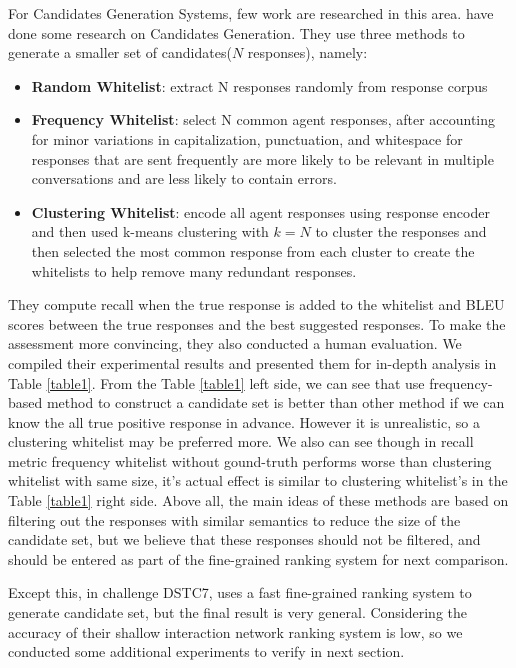 \documentclass{article}
\begin{document}
For Candidates Generation Systems, few work are researched in this area. \cite{swanson2019building} have done some research on Candidates Generation. They use three methods to generate a smaller set of candidates($N$ responses), namely: 

\begin{itemize}
	\item \textbf{Random Whitelist}: extract N responses randomly from response corpus 
	\item \textbf{Frequency Whitelist}: select N common agent responses, after accounting for minor variations in capitalization, punctuation, and whitespace for responses that are sent frequently are more likely to be relevant in multiple conversations and are less likely to contain errors.
	\item \textbf{Clustering Whitelist}: encode all agent responses using response encoder and then used k-means clustering with $k=N$ to cluster the responses and then selected the most common response from each cluster to create the whitelists to help remove many redundant responses.
\end{itemize}

They compute recall when the true response is added to the whitelist and BLEU scores between the true responses and the best suggested responses. To make the assessment more convincing, they also conducted a human evaluation. We compiled their experimental results and presented them for in-depth analysis in Table \ref{table1}. From the Table \ref{table1} left side, we can see that use frequency-based method to construct a candidate set is better than other method if we can know the all true positive response in advance. However it is unrealistic, so a clustering whitelist may be preferred more. We also can see though in recall metric frequency whitelist without gound-truth performs worse than clustering whitelist with same size, it's actual effect is similar to clustering whitelist's in the Table \ref{table1} right side. Above all, the main ideas of these methods are based on filtering out the responses with similar semantics to reduce the size of the candidate set, but we believe that these responses should not be filtered, and should be entered as part of the fine-grained ranking system for next comparison. 

Except this, in challenge DSTC7, \cite{chen2019sequential} uses a fast fine-grained ranking system to generate candidate set, but the final result is very general. Considering the accuracy of their shallow interaction network ranking system is low, so we conducted some additional experiments to verify in next section.
\end{document}
